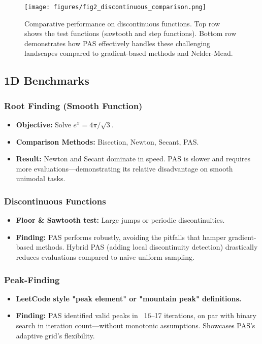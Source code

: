 \documentclass[10pt,twocolumn,letterpaper]{article}
\begin{document}
\begin{figure}[t]
    \centering
    \texttt{[image: figures/fig2\_discontinuous\_comparison.png]}
    \caption{Comparative performance on discontinuous functions. Top row shows the test functions (sawtooth and step functions). Bottom row demonstrates how PAS effectively handles these challenging landscapes compared to gradient-based methods and Nelder-Mead.}
    \label{fig:discontinuous_comparison}
\end{figure}

\subsection{1D Benchmarks}

\subsubsection{Root Finding (Smooth Function)}
\begin{itemize}
    \item \textbf{Objective:} Solve $e^x = 4\pi / \sqrt{3}$.
    \item \textbf{Comparison Methods:} Bisection, Newton, Secant, PAS.
    \item \textbf{Result:} Newton and Secant dominate in speed. PAS is slower and requires more evaluations—demonstrating its relative disadvantage on smooth unimodal tasks.
\end{itemize}

\subsubsection{Discontinuous Functions}
\begin{itemize}
    \item \textbf{Floor \& Sawtooth test:} Large jumps or periodic discontinuities.
    \item \textbf{Finding:} PAS performs robustly, avoiding the pitfalls that hamper gradient-based methods. Hybrid PAS (adding local discontinuity detection) drastically reduces evaluations compared to naive uniform sampling.
\end{itemize}

\subsubsection{Peak-Finding}
\begin{itemize}
    \item \textbf{LeetCode style "peak element" or "mountain peak" definitions.}
    \item \textbf{Finding:} PAS identified valid peaks in ~16–17 iterations, on par with binary search in iteration count—without monotonic assumptions. Showcases PAS's adaptive grid's flexibility.
\end{itemize}
\end{document}
